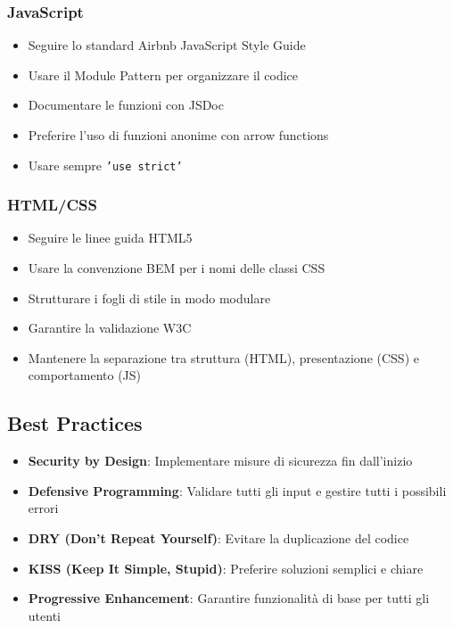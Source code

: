 \subsubsection{JavaScript}
\begin{itemize}
    \item Seguire lo standard Airbnb JavaScript Style Guide
    \item Usare il Module Pattern per organizzare il codice
    \item Documentare le funzioni con JSDoc
    \item Preferire l'uso di funzioni anonime con arrow functions
    \item Usare sempre \texttt{'use strict'}
\end{itemize}

\subsubsection{HTML/CSS}
\begin{itemize}
    \item Seguire le linee guida HTML5
    \item Usare la convenzione BEM per i nomi delle classi CSS
    \item Strutturare i fogli di stile in modo modulare
    \item Garantire la validazione W3C
    \item Mantenere la separazione tra struttura (HTML), presentazione (CSS) e comportamento (JS)
\end{itemize}

\subsection{Best Practices}
\begin{itemize}
    \item \textbf{Security by Design}: Implementare misure di sicurezza fin dall'inizio
    \item \textbf{Defensive Programming}: Validare tutti gli input e gestire tutti i possibili errori
    \item \textbf{DRY (Don't Repeat Yourself)}: Evitare la duplicazione del codice
    \item \textbf{KISS (Keep It Simple, Stupid)}: Preferire soluzioni semplici e chiare
    \item \textbf{Progressive Enhancement}: Garantire funzionalità di base per tutti gli utenti
\end{itemize}

